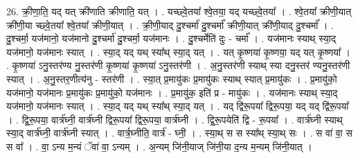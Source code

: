 \documentclass[17pt]{extarticle}
\begin{document}
26. क्री॒णा॒ति॒ यद् यत् क्री॑णाति क्रीणाति॒ यत् । . यच्छ्वे॒तया᳚ श्वे॒तया॒ यद् यच्छ्वे॒तया᳚ । . श्वे॒तया᳚ क्रीणी॒यात् क्री॑णी॒या च्छ्वे॒तया᳚ श्वे॒तया᳚ क्रीणी॒यात् । . क्री॒णी॒याद् दु॒श्चर्मा॑ दु॒श्चर्मा᳚ क्रीणी॒यात् क्री॑णी॒याद् दु॒श्चर्मा᳚ । . दु॒श्चर्मा॒ यज॑मानो॒ यज॑मानो दु॒श्चर्मा॑ दु॒श्चर्मा॒ यज॑मानः । . दु॒श्चर्मेति॑ दुः - चर्मा᳚ । . यज॑मानः स्याथ् स्या॒द् यज॑मानो॒ यज॑मानः स्यात् । . स्या॒द् यद् यथ् स्या᳚थ् स्या॒द् यत् । . यत् कृ॒ष्णया॑ कृ॒ष्णया॒ यद् यत् कृ॒ष्णया᳚ । . कृ॒ष्णया॑ ऽनु॒स्तर॑ण्य नु॒स्तर॑णी कृ॒ष्णया॑ कृ॒ष्णया॑ ऽनु॒स्तर॑णी । . अ॒नु॒स्तर॑णी स्याथ् स्या दनु॒स्तर॑ ण्यनु॒स्तर॑णी स्यात् । . अ॒नु॒स्तर॒णीत्य॑नु - स्तर॑णी । . स्या॒त् प्र॒मायु॑कः प्र॒मायु॑कः स्याथ् स्यात् प्र॒मायु॑कः । . प्र॒मायु॑को॒ यज॑मानो॒ यज॑मानः प्र॒मायु॑कः प्र॒मायु॑को॒ यज॑मानः । . प्र॒मायु॑क॒ इति॑ प्र - मायु॑कः । . यज॑मानः स्याथ् स्या॒द् यज॑मानो॒ यज॑मानः स्यात् । . स्या॒द् यद् यथ् स्या᳚थ् स्या॒द् यत् । . यद् द्वि॑रू॒पया᳚ द्विरू॒पया॒ यद् यद् द्वि॑रू॒पया᳚ । . द्वि॒रू॒पया॒ वार्त्र॑घ्नी॒ वार्त्र॑घ्नी द्विरू॒पया᳚ द्विरू॒पया॒ वार्त्र॑घ्नी । . द्वि॒रू॒पयेति॑ द्वि - रू॒पया᳚ । . वार्त्र॑घ्नी स्याथ् स्या॒द् वार्त्र॑घ्नी॒ वार्त्र॑घ्नी स्यात् । . वार्त्र॒घ्नीति॒ वार्त्र॑ - घ्नी॒ । . स्या॒थ् स स स्या᳚थ् स्या॒थ् सः । . स वा॑ वा॒ स स वा᳚ । . वा॒ ऽन्य म॒न्यं ॅवा॑ वा॒ ऽन्यम् । . अ॒न्यम् जि॑नी॒याज् जि॑नी॒या द॒न्य म॒न्यम् जि॑नी॒यात् । \newline
\end{document}
